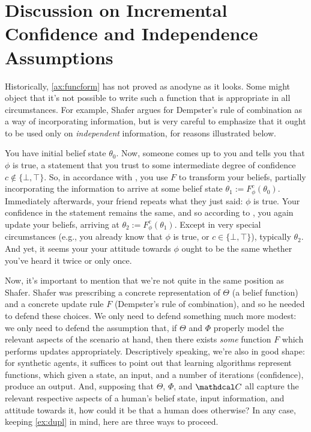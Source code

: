 \section{Discussion on Incremental Confidence and Independence Assumptions}

Historically, \cref{ax:funcform} has not proved as anodyne as it looks.
Some might object that it's not possible to write such a function that is appropriate in all circumstances.
For example, Shafer argues for Dempster's rule of combination as a way of incorporating information, but is very careful to emphasize that it ought to be used only on \emph{independent} information, for reasons illustrated below.



\begin{example}\label{ex:dupl}
	You have initial belief state $\theta_0$.
	Now, someone comes up to you and tells you that $\phi$ is true, a statement
		that you trust to some intermediate degree of confidence $c \notin\{ \bot, \top\}$.
	So, in accordance with , you use $F$ to transform your beliefs, partially incorporating the information to arrive at some belief state $\theta_1 := F^c_\phi(\theta_0)$.
	Immediately afterwards, your friend repeats what they just said: $\phi$ is true.
	Your confidence in the statement remains the same, and so according to
	, you again update your beliefs, arriving at $\theta_2 := F^c_\phi(\theta_1)$.
	Except in very special circumstances (e.g., you already know that $\phi$ is true, or $c \in \{\bot,\top\}$), typically $\theta_2$.
	And yet, it seems your your attitude towards $\phi$ ought to be the same whether you've heard it twice or only once.
\end{example}


Now, it's important to mention that we're not quite in the same position as Shafer.
Shafer was prescribing a concrete representation of $\Theta$ (a belief function) and a concrete update rule $F$ (Dempster's rule of combination), and so he needed to defend these choices.
We only need to defend something much more modest: we only need to defend the assumption that, if $\Theta$ and $\Phi$ properly model the relevant aspects of the scenario at hand, then there exists \emph{some} function $F$ which performs updates appropriately.
Descriptively speaking, we're also in good shape: for synthetic agents, it suffices to point out that learning algorithms represent functions, which given a state, an input, and a number of iterations (confidence), produce an output.
And, supposing that $\Theta$, $\Phi$, and $\confdom$ all capture the relevant respective aspects of a human's belief state, input information, and attitude towards it, how could it be that a human does otherwise?
%
In any case, keeping \cref{ex:dupl} in mind, here are three ways to proceed.

